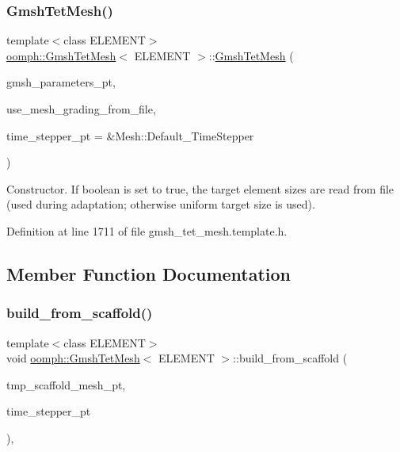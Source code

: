 \subsubsection{\texorpdfstring{Gmsh\+Tet\+Mesh()}{GmshTetMesh()}\hspace{0.1cm}{\footnotesize\ttfamily [2/2]}}
{\footnotesize\ttfamily template$<$class E\+L\+E\+M\+E\+NT$>$ \\
\hyperlink{classoomph_1_1GmshTetMesh}{oomph\+::\+Gmsh\+Tet\+Mesh}$<$ E\+L\+E\+M\+E\+NT $>$\+::\hyperlink{classoomph_1_1GmshTetMesh}{Gmsh\+Tet\+Mesh} (\begin{DoxyParamCaption}\item[{\hyperlink{classoomph_1_1GmshParameters}{Gmsh\+Parameters} $\ast$}]{gmsh\+\_\+parameters\+\_\+pt,  }\item[{const bool \&}]{use\+\_\+mesh\+\_\+grading\+\_\+from\+\_\+file,  }\item[{Time\+Stepper $\ast$}]{time\+\_\+stepper\+\_\+pt = {\ttfamily \&Mesh\+:\+:Default\+\_\+TimeStepper} }\end{DoxyParamCaption})\hspace{0.3cm}{\ttfamily [inline]}}



Constructor. If boolean is set to true, the target element sizes are read from file (used during adaptation; otherwise uniform target size is used). 



Definition at line 1711 of file gmsh\+\_\+tet\+\_\+mesh.\+template.\+h.



\subsection{Member Function Documentation}
\mbox{\label{classoomph_1_1GmshTetMesh_a80132087ae6dd00c7631823a8453e078}} 
\subsubsection{\texorpdfstring{build\+\_\+from\+\_\+scaffold()}{build\_from\_scaffold()}}
{\footnotesize\ttfamily template$<$class E\+L\+E\+M\+E\+NT$>$ \\
void \hyperlink{classoomph_1_1GmshTetMesh}{oomph\+::\+Gmsh\+Tet\+Mesh}$<$ E\+L\+E\+M\+E\+NT $>$\+::build\+\_\+from\+\_\+scaffold (\begin{DoxyParamCaption}\item[{\hyperlink{classoomph_1_1GmshTetScaffoldMesh}{Gmsh\+Tet\+Scaffold\+Mesh} $\ast$}]{tmp\+\_\+scaffold\+\_\+mesh\+\_\+pt,  }\item[{Time\+Stepper $\ast$}]{time\+\_\+stepper\+\_\+pt }\end{DoxyParamCaption})\hspace{0.3cm}{\ttfamily [inline]}, {\ttfamily [private]}}



